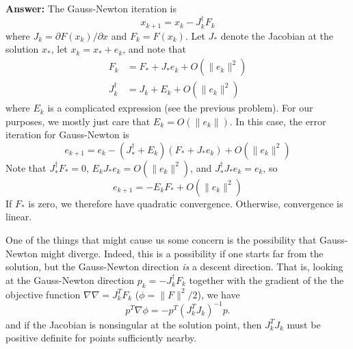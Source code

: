 \documentclass[12pt, leqno]{article}
\begin{document}
{\bf Answer:}
The Gauss-Newton iteration is
\[
  x_{k+1} = x_k - J_k^\dagger F_k
\]
where $J_k = \partial F(x_k)/\partial x$ and $F_k = F(x_k)$.
Let $J_*$ denote the Jacobian at the solution $x_*$, let
$x_k = x_* + e_k$, and note that
\begin{align*}
  F_k &= F_* + J_* e_k + O(\|e_k\|^2) \\
  J_k^\dagger &= J_k + E_k + O(\|e_k\|^2)
\end{align*}
where $E_k$ is a complicated expression (see the previous problem).
For our purposes, we mostly just care that $E_k = O(\|e_k\|)$.
In this case, the error iteration for Gauss-Newton is
\[
  e_{k+1} = e_k - (J_*^\dagger + E_k) (F_* + J_* e_k) + O(\|e_k\|^2)
\]
Note that $J_*^\dagger F_* = 0$, $E_k J_* e_k = O(\|e_k\|^2)$,
and $J_*^\dagger J_* e_k = e_k$, so
\[
  e_{k+1} = -E_k F_* + O(\|e_k\|^2)
\]
If $F_*$ is zero, we therefore have quadratic convergence.
Otherwise, convergence is linear.

One of the things that might cause us some concern is the possibility
that Gauss-Newton might diverge.  Indeed, this is a possibility if one
starts far from the solution, but the Gauss-Newton direction {\em is}
a descent direction.  That is, looking at the Gauss-Newton direction
$p_k = -J_k^\dagger F_k$ together with the gradient of the the
objective function $\nabla \nabla = J_k^T F_k$ ($\phi = \|F\|^2/2$),
we have
\[
  p^T \nabla \phi = -p^T (J_k^T J_k)^{-1} p.
\]
and if the Jacobian is nonsingular at the solution point, then
$J_k^T J_k$ must be positive definite for points sufficiently nearby.
\end{document}
